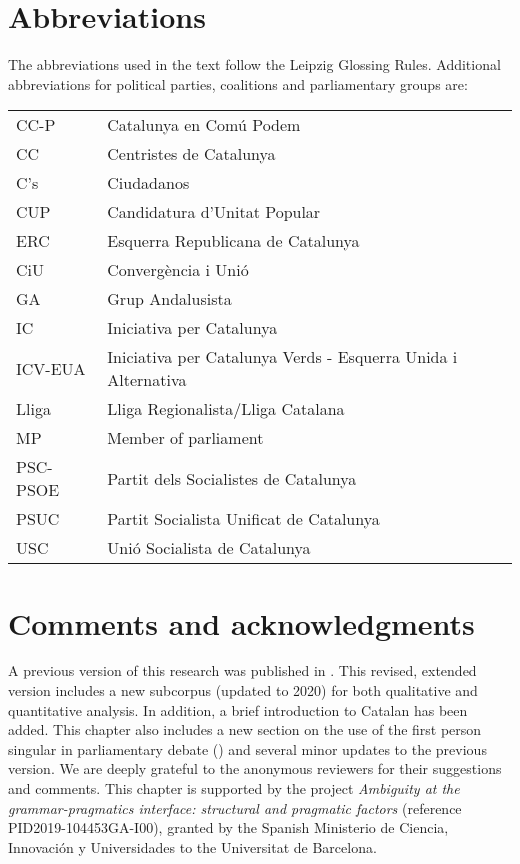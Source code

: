 \documentclass[output=paper]{langscibook}
\begin{document}
\section*{Abbreviations}\label{abbv:NogueSerrano}
The abbreviations used in the text follow the Leipzig Glossing Rules. Additional abbreviations for political parties, coalitions and parliamentary groups are:\medskip\\
 \noindent\begin{tabular}{@{}ll@{}}
 CC-P & Catalunya en Comú Podem\\
 CC & Centristes de Catalunya\\
 C’s & Ciudadanos\\
 CUP & Candidatura d’Unitat Popular\\
 ERC & Esquerra Republicana de Catalunya\\
 CiU & Convergència i Unió\\
 GA & Grup Andalusista\\
 IC& Iniciativa per Catalunya\\
 ICV-EUA & Iniciativa per Catalunya Verds - Esquerra Unida i Alternativa\\
 Lliga & Lliga Regionalista/Lliga Catalana\\
 MP & Member of parliament\\
 PSC-PSOE & Partit dels Socialistes de Catalunya\\
 PSUC & Partit Socialista Unificat de Catalunya\\
 USC & Unió Socialista de Catalunya
 \end{tabular}
 
\section*{Comments and acknowledgments}
A previous version of this research was published in \citet{Nogué2018}. This revised, extended version includes a new subcorpus (updated to 2020) for both qualitative and quantitative analysis. In addition, a brief introduction to Catalan has been added. This chapter also includes a new section on the use of the first person singular in parliamentary debate () and several minor updates to the previous version. We are deeply grateful to the anonymous reviewers for their suggestions and comments. This chapter is supported by the project \textit{Ambiguity at the grammar-pragmatics interface: structural and pragmatic factors} (reference PID2019-104453GA-I00), granted by the Spanish Ministerio de Ciencia, Innovación y Universidades to the Universitat de Barcelona.

\printbibliography[heading=subbibliography]
\end{document}

